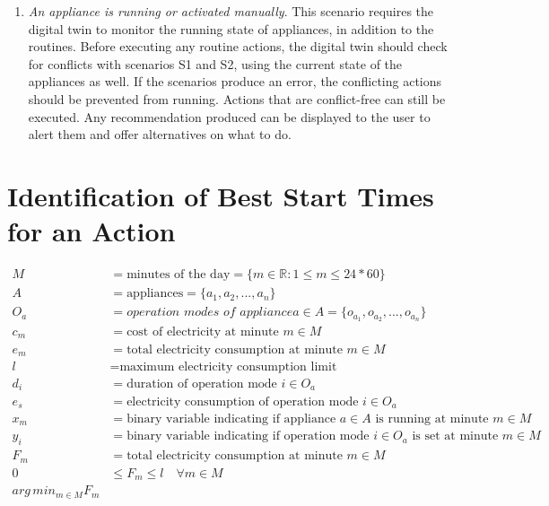 \begin{enumerate}[label={\textit{S\arabic*.}}, leftmargin=3.5em]
    \item \textit{An appliance is running or activated manually}. This scenario requires the digital twin to monitor the running state of appliances, in addition to the routines. Before executing any routine actions, the digital twin should check for conflicts with scenarios S1 and S2, using the current state of the appliances as well. If the scenarios produce an error, the conflicting actions should be prevented from running. Actions that are conflict-free can still be executed. Any recommendation produced can be displayed to the user to alert them and offer alternatives on what to do.
\end{enumerate}

\section{Identification of Best Start Times for an Action}

\begin{equation}
    \begin{aligned}
        M &= \text{minutes of the day} = \{m \in \mathbb{R}: 1 \leq m \leq 24*60\}\\
        A &= \text{appliances} = \{a_1, a_2, ..., a_n\}\\
        O_a &= \textit{operation modes of appliance} a \in A = \{o_{a_1}, o_{a_2}, ..., o_{a_n}\}\\
        c_m &= \text{cost of electricity at minute } m \in M\\
        e_m &= \text{total electricity consumption at minute } m \in M\\
        l &= \text{maximum electricity consumption limit}\\
        d_i &= \text{duration of operation mode } i \in O_a\\
        e_s &= \text{electricity consumption of operation mode } i \in O_a\\
        x_m &= \text{binary variable indicating if appliance } a \in A \text{ is running at minute } m \in M\\
        y_i &= \text{binary variable indicating if operation mode } i \in O_a \text{ is set at minute } m \in M\\
        F_m &= \text{total electricity consumption at minute } m \in M\\
        0 &\leq F_m \leq l \quad \forall m \in M\\
        arg\,min_{m \in M}{F_m}
    \end{aligned}
\end{equation}